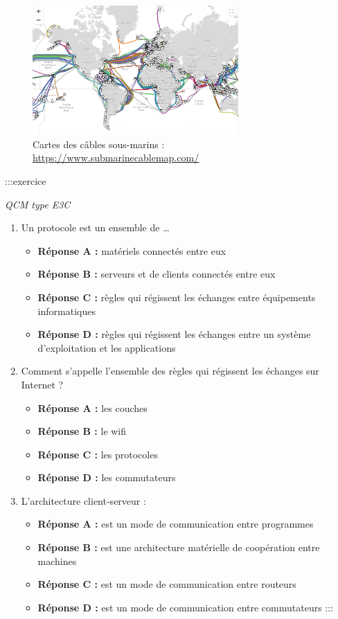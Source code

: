 \documentclass[
  11pt,
]{article}
\providecommand{\tightlist}{%
  \setlength{\itemsep}{0pt}\setlength{\parskip}{0pt}}
\newcounter{def}
\newcounter{prog}
\begin{document}
\begin{figure}
\centering
\includegraphics[width=0.7\textwidth,height=\textheight]{images/cable-sousmarin.png}
\caption{Cartes des câbles sous-marins :
\url{https://www.submarinecablemap.com/}}
\end{figure}

:::exercice

\emph{QCM type E3C}

\begin{enumerate}
\def\labelenumi{\arabic{enumi}.}
\item
  Un protocole est un ensemble de \ldots{}

  \begin{itemize}
  \tightlist
  \item
    \textbf{Réponse A :} matériels connectés entre eux
  \item
    \textbf{Réponse B :} serveurs et de clients connectés entre eux
  \item
    \textbf{Réponse C :} règles qui régissent les échanges entre
    équipements informatiques
  \item
    \textbf{Réponse D :} règles qui régissent les échanges entre un
    système d'exploitation et les applications
  \end{itemize}
\item
  Comment s'appelle l'ensemble des règles qui régissent les échanges sur
  Internet ?

  \begin{itemize}
  \tightlist
  \item
    \textbf{Réponse A :} les couches
  \item
    \textbf{Réponse B :} le wifi
  \item
    \textbf{Réponse C :} les protocoles
  \item
    \textbf{Réponse D :} les commutateurs
  \end{itemize}
\item
  L'architecture client-serveur :

  \begin{itemize}
  \tightlist
  \item
    \textbf{Réponse A :} est un mode de communication entre programmes
  \item
    \textbf{Réponse B :} est une architecture matérielle de coopération
    entre machines
  \item
    \textbf{Réponse C :} est un mode de communication entre routeurs
  \item
    \textbf{Réponse D :} est un mode de communication entre commutateurs
    :::
  \end{itemize}
\end{enumerate}
\end{document}
